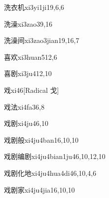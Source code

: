 \begin{verbete}{洗衣机}{xi3yi1ji1}{9,6,6}
\end{verbete}

\begin{verbete}{洗澡}{xi3zao3}{9,16}
\end{verbete}

\begin{verbete}{洗澡间}{xi3zao3jian1}{9,16,7}
\end{verbete}

\begin{verbete}{喜欢}{xi3huan5}{12,6}
\end{verbete}

\begin{verbete}{喜剧}{xi3ju4}{12,10}
\end{verbete}

\begin{verbete}{戏}{xi4}{6}[Radical 戈]
\end{verbete}

\begin{verbete}{戏法}{xi4fa3}{6,8}
\end{verbete}

\begin{verbete}{戏剧}{xi4ju4}{6,10}
\end{verbete}

\begin{verbete}{戏剧般}{xi4ju4ban1}{6,10,10}
\end{verbete}

\begin{verbete}{戏剧编剧}{xi4ju4bian1ju4}{6,10,12,10}
\end{verbete}

\begin{verbete}{戏剧化地}{xi4ju4hua4di4}{6,10,4,6}
\end{verbete}

\begin{verbete}{戏剧家}{xi4ju4jia1}{6,10,10}
\end{verbete}

